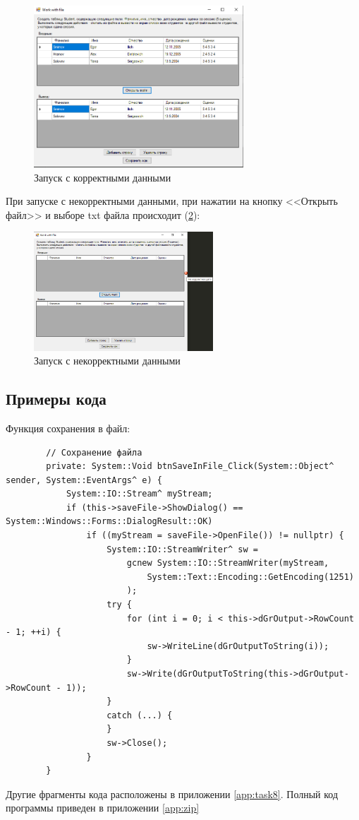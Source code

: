 \begin{figure}[!h]
    \centering
    \includegraphics[width = 0.7\textwidth]{images/Task8/WorkOpenFile.png}
    \caption{Запуск с корректными данными}
    \label{fig:WorkForm8}
\end{figure}

При запуске с некорректными данными, при нажатии на кнопку <<Открыть файл>> и выборе txt файла происходит (\ref{fig:BadInputNotIntForm8}):

\begin{figure}[!h]
    \centering
    \includegraphics[width = 0.6\textwidth]{images/Task8/OpenFileBadData.png}
    \caption{Запуск с некорректными данными}
    \label{fig:BadInputNotIntForm8}
\end{figure}

\subsection{Примеры кода}

Функция сохранения в файл:

\begin{verbatim}
		// Сохранение файла
		private: System::Void btnSaveInFile_Click(System::Object^ sender, System::EventArgs^ e) {
			System::IO::Stream^ myStream;
			if (this->saveFile->ShowDialog() == System::Windows::Forms::DialogResult::OK)
				if ((myStream = saveFile->OpenFile()) != nullptr) {
					System::IO::StreamWriter^ sw =
						gcnew System::IO::StreamWriter(myStream,
							System::Text::Encoding::GetEncoding(1251)
						);
					try {
						for (int i = 0; i < this->dGrOutput->RowCount - 1; ++i) {
							sw->WriteLine(dGrOutputToString(i));
						}
						sw->Write(dGrOutputToString(this->dGrOutput->RowCount - 1));
					}
					catch (...) {
					}
					sw->Close();
				}
		}
\end{verbatim}

Другие фрагменты кода расположены в приложении \ref{app:task8}. Полный код программы приведен в приложении \ref{app:zip}
